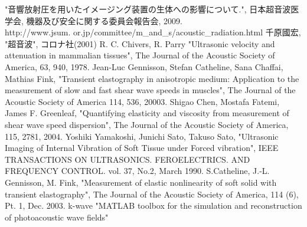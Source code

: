 \begin{thebibliography}{9}
     "音響放射圧を用いたイメージング装置の生体への影響について.", 日本超音波医学会, 機器及び安全に関する委員会報告会, 2009. \\http://www.jsum. or.jp/committee/m\_and\_s/acoustic\_radiation.html
      千原國宏,     
     "超音波", コロナ社(2001)
      R. C. Chivers, R. Parry
     "Ultrasonic velocity and attenuation in mammalian tissues", The Journal of the Acoustic Society of America, 63, 940, 1978.
       Jean-Luc Gennisson, Stefan Catheline, Sana Chaffai, Mathias Fink,
      "Transient elastography in anisotropic medium: Application to the measurement of slow and fast shear wave speeds in muscles", The Journal of the Acoustic Society of America 114, 536, 20003.
       Shigao Chen, Mostafa Fatemi, James F. Greenleaf,
      "Quantifying elasticity and viscosity from measurement of shear wave speed dispersion", The Journal of the Acoustic Society of America, 115, 2781, 2004.
       Yoshiki Yamakoshi, Junichi Sato, Takuso Sato,
      "Ultrasonic Imaging of Internal Vibration of Soft Tissue under Forced vibration", IEEE TRANSACTIONS ON ULTRASONICS. FEROELECTRICS. AND FREQUENCY CONTROL. vol. 37, No.2, March 1990.
       S.Catheline, J.-L. Gennisson, M. Fink,
      "Measurement of elastic nonlinearity of soft solid with transient elastography", The Journal of the Acoustic Society of America, 114 (6), Pt. 1, Dec. 2003.
      k-wave
     "MATLAB toolbox for the simulation and reconstruction of photoacoustic wave fields"
\end{thebibliography}